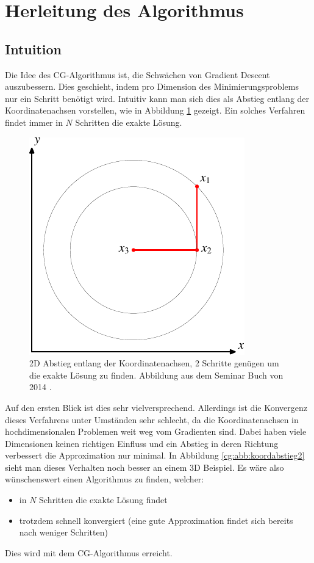 \section{Herleitung des Algorithmus}
\label{cg:section:herleitung}

\subsection{Intuition}
Die Idee des CG-Algorithmus ist, die Schwächen von Gradient Descent auszubessern.
Dies geschieht, indem pro Dimension des Minimierungsproblems nur ein Schritt benötigt wird.
Intuitiv kann man sich dies als Abstieg entlang der Koordinatenachsen vorstellen, wie in Abbildung \ref{cg:abb:koordabstieg} gezeigt.
Ein solches Verfahren findet immer in $N$ Schritten die exakte Lösung.

\begin{figure}	
	\centering
	\includegraphics{papers/cg/images/descent-2}
	\caption{2D Abstieg entlang der Koordinatenachsen, 2 Schritte genügen um die exakte Lösung zu finden. 
		Abbildung aus dem Seminar Buch von 2014 \cite{cg:book:hpc}.}
	\label{cg:abb:koordabstieg}
\end{figure}

Auf den ersten Blick ist dies sehr vielversprechend.
Allerdings ist die Konvergenz dieses Verfahrens unter Umständen sehr schlecht, da die Koordinatenachsen in hochdimensionalen Problemen weit weg vom Gradienten sind.
Dabei haben viele Dimensionen keinen richtigen Einfluss und ein Abstieg in deren Richtung verbessert die Approximation nur minimal.
In Abbildung \ref{cg:abb:koordabstieg2} sieht man dieses Verhalten noch besser an einem 3D Beispiel.
Es wäre also wünschenswert einen Algorithmus zu finden, welcher:
\begin{itemize}
	\item in $N$ Schritten die exakte Lösung findet
	\item trotzdem schnell konvergiert (eine gute Approximation findet sich bereits nach weniger Schritten)
\end{itemize}
Dies wird mit dem CG-Algorithmus erreicht.

